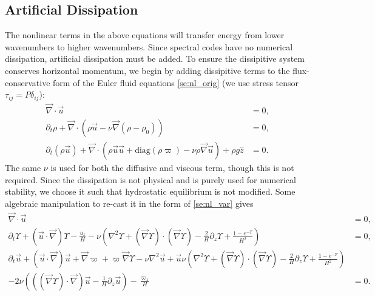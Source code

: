 \documentclass[
        fleqn,
        usenatbib,
    ]{mnras}
\newcommand*{\p}[1]{\left(#1\right)}
\begin{document}
\subsection{Artificial Dissipation}

The nonlinear terms in the above equations will transfer energy from lower
wavenumbers to higher wavenumbers. Since spectral codes have no numerical
dissipation, artificial dissipation must be added. To ensure the dissipitive
system conserves horizontal momentum, we begin by adding dissipitive terms to
the flux-conservative form of the Euler fluid equations \autoref{se:nl_orig} (we
use stress tensor $\tau_{ij} = P\delta_{ij}$):
\begin{subequations}
    \begin{align}
        \vec{\nabla} \cdot \vec{u} &= 0,\\
        \partial_t \rho + \vec{\nabla} \cdot (\rho \vec{u} - \nu
            \vec{\nabla}(\rho - \rho_0)) &= 0,\label{eq:visc_cons_mom}\\
        \partial_t (\rho \vec{u}) + \vec{\nabla} \cdot (\rho \vec{u} \vec{u} +
            \mathrm{diag}(\rho \varpi) - \nu \rho \vec{\nabla}\vec{u}) + \rho g
            \hat{z} &= 0.
    \end{align}
\end{subequations}
The same $\nu$ is used for both the diffusive and viscous term, though this is
not required. Since the dissipation is not physical and is purely used for
numerical stability, we choose it such that hydrostatic equilibrium is not
modified. Some algebraic manipulation to re-cast it in the form of
\autoref{se:nl_var} gives
\begin{subequations}
    \begin{align}
        \vec{\nabla} \cdot \vec{u} &= 0,\\
        \partial_t \Upsilon + \p{\vec{u} \cdot \vec{\nabla}} \Upsilon -
            \frac{u_z}{H} - \nu\p{\nabla^2 \Upsilon + \p{\vec{\nabla}
            \Upsilon} \cdot \p{\vec{\nabla}\Upsilon} - \frac{2}{H}\partial_z
            \Upsilon + \frac{1 - e^{-\Upsilon}}{H^2}} &= 0,\\
        \partial_t \vec{u} + \p{\vec{u} \cdot \vec{\nabla}}\vec{u} +
            \vec{\nabla} \varpi + \varpi \vec{\nabla} \Upsilon - \nu \nabla^2
            \vec{u} + \vec{u} \nu\p{\nabla^2 \Upsilon + \p{\vec{\nabla}
            \Upsilon} \cdot \p{\vec{\nabla}\Upsilon} - \frac{2}{H}\partial_z
            \Upsilon + \frac{1 - e^{-\Upsilon}}{H^2}}&{}\nonumber\\
        - 2\nu \p{\p{\p{\vec{\nabla}\Upsilon} \cdot \vec{\nabla}}\vec{u} -
            \frac{1}{H}\partial_z \vec{u}} - \frac{\varpi_1}{H} &= 0.
    \end{align}
\end{subequations}
\end{document}
